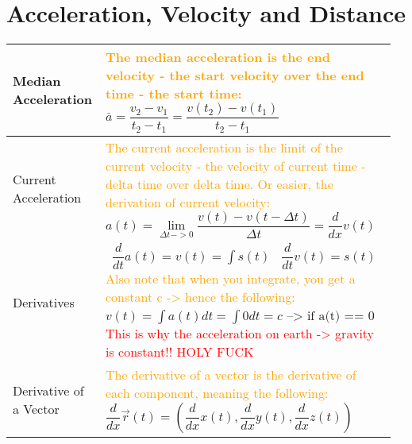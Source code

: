 \documentclass[main.tex,fontsize=8pt,paper=a4,paper=portrait,DIV=calc,]{scrartcl}
\begin{document}
\pagebreak
\begin{table}[ht!]
\section{Acceleration, Velocity and Distance}
\begin{tabular}{|m{0.2\linewidth}|m{0.755\linewidth}|}
\hline
Median Acceleration & 
\textcolor{orange}{The median acceleration is the end velocity - the start velocity over the end time - the start time:}\newline
\, \newline
\huge \( \overset{\_}{a} = \dfrac{v_2 - v_1}{t_2 - t_1} = \dfrac{v(t_2) - v(t_1)}{t_2 - t_1} \) \newline
\normalsize \\
\hline
Current Acceleration & 
\textcolor{orange}{The current acceleration is the limit of the current velocity - the velocity of current time - delta time over delta time. \newline
Or easier, the derivation of current velocity:}\newline
\, \newline
\huge \( a(t) = \underset{\Delta t -> 0}{\lim} \dfrac{v(t) - v(t - \Delta t)}{\Delta t} = \dfrac{d}{dx}v(t)\) \newline
\normalsize \\
\hline
Derivatives &
\, \newline
\huge \(\dfrac{d}{dt}a(t) = v(t) = \int{s(t)} \)\newline
\, \newline
\huge \(\dfrac{d}{dt}v(t) = s(t)\)\newline
\, \newline
\normalsize \textcolor{orange}{Also note that when you integrate, you get a constant c -> hence the following:}\newline
\, \newline
\huge \( v(t) = \int{a(t) dt} = \int{0 dt} = c \text{ --> if a(t) == 0}\) \newline
\, \newline
\normalsize \textcolor{red}{This is why the acceleration on earth -> gravity is constant!! HOLY FUCK}\\
\hline
Derivative of a Vector & 
\textcolor{orange}{The derivative of a vector is the derivative of each component, meaning the following:}\newline
\large \(\dfrac{d}{dx} \vec{r}(t) = (\dfrac{d}{dx} x(t), \dfrac{d}{dx} y(t), \dfrac{d}{dx} z(t) ) \)\newline

\end{tabular}
\end{table}
\end{document}

